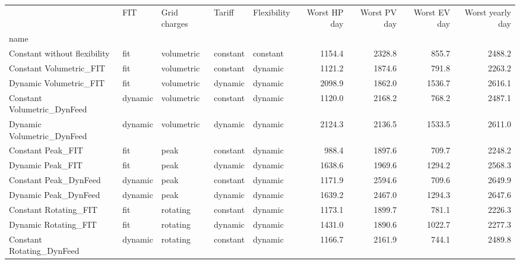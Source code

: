 \begin{tabular}{lllllrrrr}
\toprule
{} &      FIT & Grid charges &    Tariff & Flexibility &  Worst HP day &  Worst PV day &  Worst EV day &  Worst yearly day \\
name                         &          &              &           &             &               &               &               &                   \\
\midrule
Constant without flexibility &      fit &   volumetric &  constant &    constant &        1154.4 &        2328.8 &         855.7 &            2488.2 \\
Constant Volumetric\_FIT      &      fit &   volumetric &  constant &     dynamic &        1121.2 &        1874.6 &         791.8 &            2263.2 \\
Dynamic Volumetric\_FIT       &      fit &   volumetric &   dynamic &     dynamic &        2098.9 &        1862.0 &        1536.7 &            2616.1 \\
Constant Volumetric\_DynFeed  &  dynamic &   volumetric &  constant &     dynamic &        1120.0 &        2168.2 &         768.2 &            2487.1 \\
Dynamic Volumetric\_DynFeed   &  dynamic &   volumetric &   dynamic &     dynamic &        2124.3 &        2136.5 &        1533.5 &            2611.0 \\
Constant Peak\_FIT            &      fit &         peak &  constant &     dynamic &         988.4 &        1897.6 &         709.7 &            2248.2 \\
Dynamic Peak\_FIT             &      fit &         peak &   dynamic &     dynamic &        1638.6 &        1969.6 &        1294.2 &            2568.3 \\
Constant Peak\_DynFeed        &  dynamic &         peak &  constant &     dynamic &        1171.9 &        2594.6 &         709.6 &            2649.9 \\
Dynamic Peak\_DynFeed         &  dynamic &         peak &   dynamic &     dynamic &        1639.2 &        2467.0 &        1294.3 &            2647.6 \\
Constant Rotating\_FIT        &      fit &     rotating &  constant &     dynamic &        1173.1 &        1899.7 &         781.1 &            2226.3 \\
Dynamic Rotating\_FIT         &      fit &     rotating &   dynamic &     dynamic &        1431.0 &        1890.6 &        1022.7 &            2277.3 \\
Constant Rotating\_DynFeed    &  dynamic &     rotating &  constant &     dynamic &        1166.7 &        2161.9 &         744.1 &            2489.8 \\

\end{tabular}
